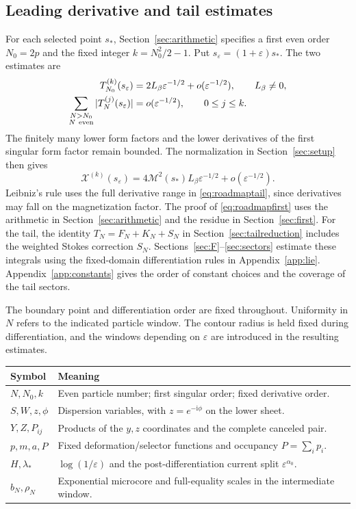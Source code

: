 \documentclass[11pt]{article}
\numberwithin{equation}{section}
\theoremstyle{definition}
\newcommand{\ii}{\mathrm i}
\newcommand{\eps}{\varepsilon}
\newcommand{\M}{\mathcal M}
\begin{document}
\subsection{Leading derivative and tail estimates}
For each selected point \(s_*\), Section~\ref{sec:arithmetic} specifies
a first even order \(N_0=2p\) and the fixed integer
\(k=N_0^2/2-1\). Put \(s_\eps=(1+\eps)s_*\). The two estimates are
\begin{align}
 T_{N_0}^{(k)}(s_\eps)
   &=2L_\beta\eps^{-1/2}+o(\eps^{-1/2}),\qquad L_\beta\ne0,
       \label{eq:roadmapfirst}\\
 \sum_{\substack{N>N_0\\N\ {\rm even}}}
       |T_N^{(j)}(s_\eps)|
   &=o(\eps^{-1/2}),\qquad 0\le j\le k .
       \label{eq:roadmaptail}
\end{align}
The finitely many lower form factors and the lower derivatives of the
first singular form factor remain bounded. The normalization in
Section~\ref{sec:setup} then gives
\[
 \mathcal X^{(k)}(s_\eps)
   =4\M^2(s_*)L_\beta\eps^{-1/2}+o(\eps^{-1/2}).
\]
Leibniz's rule uses the full derivative range in \eqref{eq:roadmaptail},
since derivatives may fall on the magnetization factor. The proof of
\eqref{eq:roadmapfirst} uses the arithmetic in Section~\ref{sec:arithmetic}
and the residue in Section~\ref{sec:first}. For the tail, the identity
\(T_N=F_N+K_N+S_N\) in Section~\ref{sec:tailreduction} includes the
weighted Stokes correction \(S_N\). Sections~\ref{sec:F}--\ref{sec:sectors}
estimate these integrals using the fixed-domain differentiation rules
in Appendix~\ref{app:lie}. Appendix~\ref{app:constants} gives the order of
constant choices and the coverage of the tail sectors.

The boundary point and differentiation order are fixed throughout.
Uniformity in \(N\) refers to the indicated particle window. The contour
radius is held fixed during differentiation, and the windows depending
on \(\eps\) are introduced in the resulting estimates.

\begin{center}
\begin{tabular}{p{}p{}}
\toprule
Symbol & Meaning\\
\midrule
\(N,N_0,k\) & Even particle number; first singular order; fixed derivative order.\\
\(S,W,z,\phi\) & Dispersion variables, with \(z=e^{-\ii\phi}\) on the lower sheet.\\
\(Y,Z,P_{ij}\) & Products of the \(y,z\) coordinates and the complete canceled pair.\\
\(p,m,a,P\) & Fixed deformation/selector functions and occupancy \(P=\sum_i p_i\).\\
\(H,\lambda_*\) & \(\log(1/\eps)\) and the post-differentiation current split \(\eps^{\alpha_0}\).\\
\(b_N,\rho_N\) & Exponential microcore and full-equality scales in the intermediate window.\\
\bottomrule
\end{tabular}
\end{center}
\end{document}
